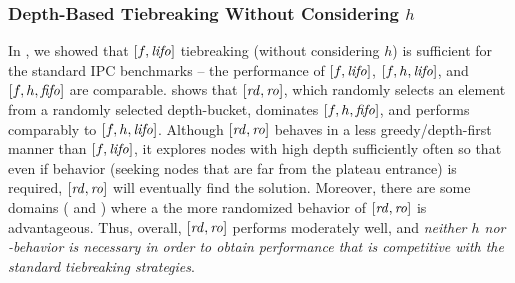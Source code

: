 
\subsubsection{Depth-Based Tiebreaking Without Considering $h$}

In , we showed that $[f,{\mbox{\textit{lifo}}}]$ tiebreaking (without considering $h$) is
sufficient for the standard IPC benchmarks -- the performance of $[f,{\mbox{\textit{lifo}}}]$, $[f,h,{\mbox{\textit{lifo}}}]$, and $[f,h,{\mbox{\textit{fifo}}}]$ are comparable.
 shows that $[{\mbox{\textit{rd}}},{\mbox{\textit{ro}}}]$, which randomly selects an element from a randomly selected depth-bucket, dominates $[f,h,{\mbox{\textit{fifo}}}]$,
and performs comparably to $[f,h,{\mbox{\textit{lifo}}}]$.
Although $[{\mbox{\textit{rd}}},{\mbox{\textit{ro}}}]$ behaves in a less greedy/depth-first manner than $[f,{\mbox{\textit{lifo}}}]$, 
it explores nodes with high depth sufficiently often so that even if \lifo behavior (seeking nodes that are far from the plateau entrance) is required, $[{\mbox{\textit{rd}}},{\mbox{\textit{ro}}}]$ will eventually find the solution.
Moreover, there are some domains ( and ) where a the more randomized behavior of $[{\mbox{\textit{rd}}},{\mbox{\textit{ro}}}]$ is advantageous.
Thus, overall, $[{\mbox{\textit{rd}}},{\mbox{\textit{ro}}}]$ performs moderately well, and 
\emph{neither $h$ nor \lifo-behavior is necessary in order to obtain performance that is competitive with the standard
tiebreaking strategies}.



